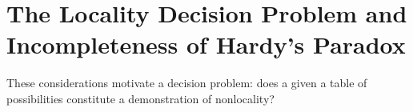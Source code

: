 \documentclass[reprint]{revtex4-1}
\theoremstyle{definition}
\begin{document}



\section{The Locality Decision Problem and Incompleteness of Hardy's Paradox}


These considerations motivate a decision problem: does a given a table of possibilities constitute a demonstration of nonlocality?
\end{document}
